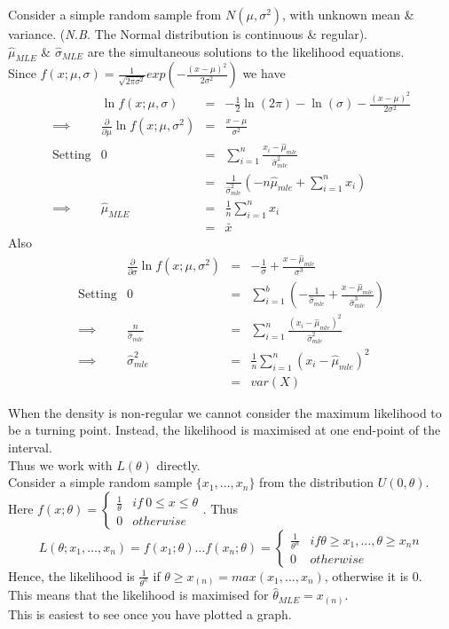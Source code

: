 \documentclass[11pt,a4paper]{article}
\begin{document}
Consider a simple random sample from $N(\mu,\sigma^2)$, with unknown mean \& variance. (\textit{N.B.} The Normal distribution is continuous \& regular).\\
$\hat{\mu}_{MLE}$ \& $\hat{\sigma}_{MLE}$ are the simultaneous solutions to the likelihood equations.\\
Since $f(x;\mu,\sigma)=\frac{1}{\sqrt{2\pi\sigma^2}}exp(-\frac{(x-\mu)^2}{2\sigma^2})$ we have
\[\begin{array}{rrcl}
&\ln f(x;\mu,\sigma)&=&-\frac{1}{2}\ln(2\pi)-\ln(\sigma)-\frac{(x-\mu)^2}{2\sigma^2}\\
\implies&\frac{\partial}{\partial\mu}\ln f(x;\mu,\sigma^2)&=&\frac{x-\mu}{\sigma^2}\\
\mathrm{Setting}&0&=&\sum_{i=1}^n\frac{x_i-\hat{\mu}_{mle}}{\hat{\sigma}_{mle}^2}\\
&&=&\frac{1}{\hat{\sigma}_{mle}^2}\left(-n\hat{\mu}_{mle}+\sum_{i=1}^nx_i\right)\\
\implies&\hat{\mu}_{MLE}&=&\frac{1}{n}\sum_{i=1}^nx_i\\
&&=&\bar{x}
\end{array}\]
Also
\[\begin{array}{rrcl}
&\frac{\partial}{\partial\sigma}\ln f(x;\mu,\sigma^2)&=&-\frac{1}{\sigma}+\frac{x-\hat{\mu}_{mle}}{\sigma^3}\\
\mathrm{Setting}&0&=&\sum_{i=1}^b\left(-\frac{1}{\hat{\sigma}_{mle}}+\frac{x-\hat{\mu}_{mle}}{\hat{\sigma}_{mle}^3}\right)\\
\implies&\frac{n}{\hat{\sigma}_{mle}}&=&\sum_{i=1}^n\frac{(x_i-\hat{\mu}_{mle})^2}{\hat{\sigma}_{mle}^2}\\
\implies&\hat{\sigma}_{mle}^2&=&\frac{1}{n}\sum_{i=1}^n(x_i-\hat{\mu}_{mle})^2\\
&&=&var(X)
\end{array}\]

When the density is non-regular we cannot consider the maximum likelihood to be a turning point. Instead, the likelihood is maximised at one end-point of the interval.\\
Thus we work with $L(\theta)$ directly.\\

Consider a simple random sample $\{x_1,\dots,x_n\}$ from the distribution $U(0,\theta)$.\\
Here $f(x;\theta)=\begin{cases}\frac{1}{\theta}&if\ 0\leq x\leq\theta\\0&otherwise\end{cases}$. Thus
$$L(\theta;x_1,\dots,x_n)=f(x_1;\theta)\dots f(x_n;\theta)=\begin{cases}\frac{1}{\theta^n}&if\theta\geq x_1,\dots,\theta\geq x_nn\\0&otherwise\end{cases}$$
Hence, the likelihood is $\frac{1}{\theta^n}$ if $\theta\geq x_{(n)}=max(x_1,\dots,x_n)$, otherwise it is 0.\\
This means that the likelihood is maximised for $\hat{\theta}_{MLE}=x_{(n)}$.\\
\nb This is easiest to see once you have plotted a graph.\\
\end{document}
